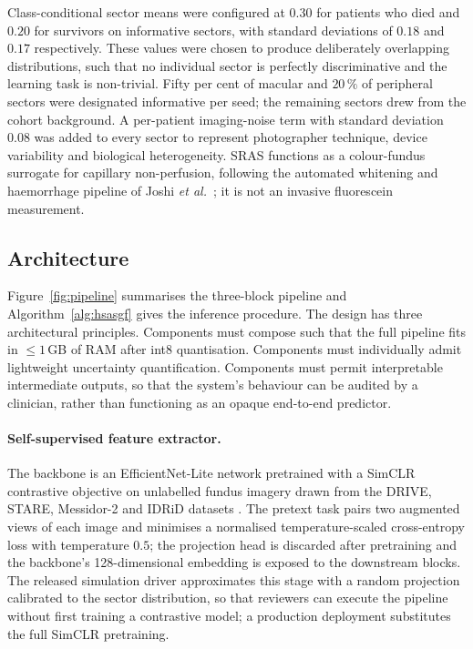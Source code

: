 \documentclass[twocolumn,10pt]{article}
\begin{document}
Class-conditional sector means were configured at $0.30$ for
patients who died and $0.20$ for survivors on informative sectors,
with standard deviations of $0.18$ and $0.17$ respectively. These
values were chosen to produce deliberately overlapping
distributions, such that no individual sector is perfectly
discriminative and the learning task is non-trivial. Fifty per
cent of macular and $20\,\%$ of peripheral sectors were designated
informative per seed; the remaining sectors drew from the cohort
background. A per-patient imaging-noise term with standard
deviation $0.08$ was added to every sector to represent photographer
technique, device variability and biological heterogeneity. SRAS
functions as a colour-fundus surrogate for capillary non-perfusion,
following the automated whitening and haemorrhage pipeline of
Joshi \emph{et al.}\ \cite{Joshi2017}; it is not an invasive
fluorescein measurement.

\subsection{Architecture}
\label{sec:arch}
Figure~\ref{fig:pipeline} summarises the three-block pipeline and
Algorithm~\ref{alg:hsasgf} gives the inference procedure. The
design has three architectural principles. Components must compose
such that the full pipeline fits in $\leq\!1$\,GB of RAM after int8
quantisation. Components must individually admit lightweight
uncertainty quantification. Components must permit interpretable
intermediate outputs, so that the system's behaviour can be audited
by a clinician, rather than functioning as an opaque
end-to-end predictor.

\paragraph{Self-supervised feature extractor.}
The backbone is an EfficientNet-Lite network \cite{Tan2019}
pretrained with a SimCLR contrastive objective
\cite{Chen2020SimCLR} on unlabelled fundus imagery drawn from the
DRIVE, STARE, Messidor-2 and IDRiD datasets
\cite{Staal2004DRIVE,DRIVE2004,Decenciere2014Messidor}. The
pretext task pairs two augmented views of each image and
minimises a normalised temperature-scaled cross-entropy loss with
temperature $0.5$; the projection head is discarded after
pretraining and the backbone's 128-dimensional embedding is
exposed to the downstream blocks. The released simulation driver
approximates this stage with a random projection calibrated to the
sector distribution, so that reviewers can execute the pipeline
without first training a contrastive model; a production
deployment substitutes the full SimCLR pretraining.
\end{document}
